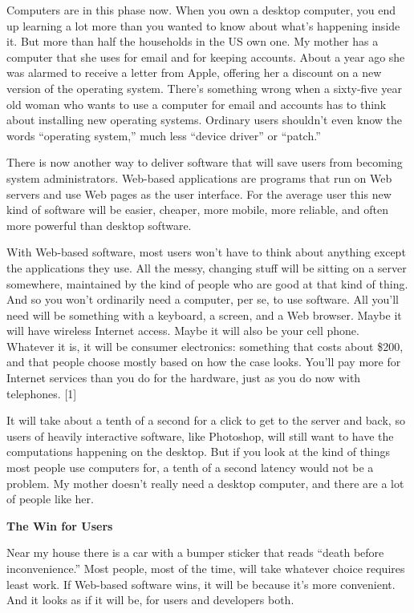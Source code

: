 Computers are in this phase now. When you own a desktop computer, you
end up learning a lot more than you wanted to know about what's
happening inside it. But more than half the households in the US own
one. My mother has a computer that she uses for email and for keeping
accounts. About a year ago she was alarmed to receive a letter from
Apple, offering her a discount on a new version of the operating system.
There's something wrong when a sixty-five year old woman who wants to
use a computer for email and accounts has to think about installing new
operating systems. Ordinary users shouldn't even know the words
``operating system,'' much less ``device driver'' or ``patch.''

There is now another way to deliver software that will save users from
becoming system administrators. Web-based applications are programs that
run on Web servers and use Web pages as the user interface. For the
average user this new kind of software will be easier, cheaper, more
mobile, more reliable, and often more powerful than desktop software.

With Web-based software, most users won't have to think about anything
except the applications they use. All the messy, changing stuff will be
sitting on a server somewhere, maintained by the kind of people who are
good at that kind of thing. And so you won't ordinarily need a computer,
per se, to use software. All you'll need will be something with a
keyboard, a screen, and a Web browser. Maybe it will have wireless
Internet access. Maybe it will also be your cell phone. Whatever it is,
it will be consumer electronics: something that costs about \$200, and
that people choose mostly based on how the case looks. You'll pay more
for Internet services than you do for the hardware, just as you do now
with telephones. {[}1{]}

It will take about a tenth of a second for a click to get to the server
and back, so users of heavily interactive software, like Photoshop, will
still want to have the computations happening on the desktop. But if you
look at the kind of things most people use computers for, a tenth of a
second latency would not be a problem. My mother doesn't really need a
desktop computer, and there are a lot of people like her.

\textbf{The Win for Users}

Near my house there is a car with a bumper sticker that reads ``death
before inconvenience.'' Most people, most of the time, will take
whatever choice requires least work. If Web-based software wins, it will
be because it's more convenient. And it looks as if it will be, for
users and developers both.

